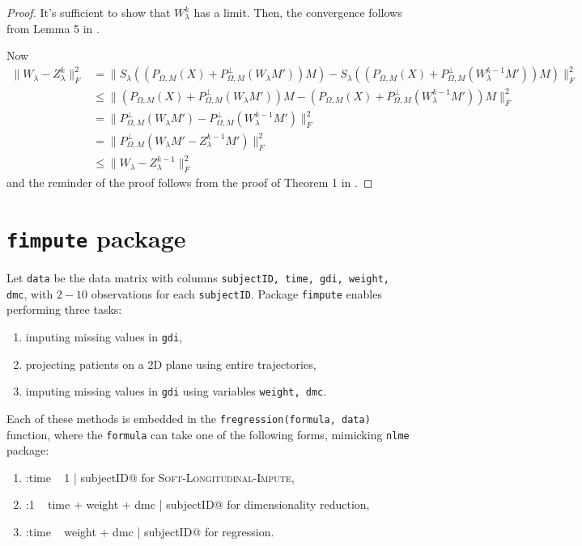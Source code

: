 \documentclass[preprint]{imsart}
\numberwithin{equation}{section}
\theoremstyle{plain}
\begin{document}
\begin{proof}
It's sufficient to show that $W_{\lambda}^k$ has a limit. Then, the convergence follows from Lemma 5 in \citep{mazumder2010spectral}.

Now
\begin{align*}
\|W_\lambda - Z_\lambda^k\|_F^2 &= \|S_\lambda((P_{\Omega,M}(X) + P_{\Omega,M}^\perp(W_\lambda M'))M) - S_\lambda((P_{\Omega,M}(X) + P_{\Omega,M}^\perp(W_\lambda^{k-1}M'))M)\|_F^2 \\
&\leq \|(P_{\Omega,M}(X) + P_{\Omega,M}^\perp(W_\lambda M'))M - (P_{\Omega,M}(X) + P_{\Omega,M}^\perp(W_\lambda^{k-1}M'))M\|_F^2\\
&= \|P_{\Omega,M}^\perp(W_\lambda M') - P_{\Omega,M}^\perp(W_\lambda^{k-1}M')\|_F^2\\
&= \|P_{\Omega,M}^\perp(W_\lambda M' - Z_\lambda^{k-1}M')\|_F^2\\
&\leq \|W_\lambda - Z_\lambda^{k-1}\|_F^2
\end{align*}
and the reminder of the proof follows from the proof of Theorem 1 in \citep{mazumder2010spectral}.
\end{proof}

\section{\texttt{fimpute} package}

Let \verb|data| be the data matrix with columns \verb|subjectID, time, gdi, weight, dmc|, with $2-10$ observations for each \verb|subjectID|. Package \verb|fimpute| enables performing three tasks:
\begin{enumerate}
\item imputing missing values in \verb|gdi|,
\item projecting patients on a 2D plane using entire trajectories,
\item imputing missing values in \verb|gdi| using variables \verb|weight, dmc|.
\end{enumerate}
Each of these methods is embedded in the \verb|fregression(formula, data)| function, where the \verb|formula| can take one of the following forms, mimicking \verb|nlme| package:
\begin{enumerate}
\item \verb@gdi:time ~ 1 | subjectID@ for \textsc{Soft-Longitudinal-Impute},
\item \verb@gdi:1 ~ time + weight + dmc | subjectID@ for dimensionality reduction,
\item \verb@gdi:time ~ weight + dmc | subjectID@ for regression. 
\end{enumerate}
\end{document}
